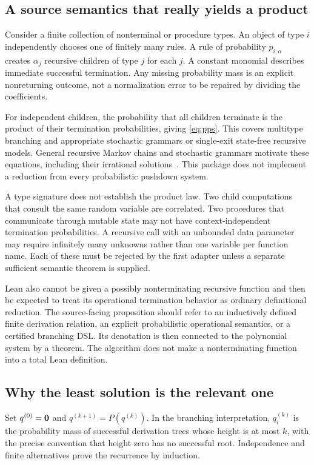 \documentclass[11pt,a4paper]{article}
\theoremstyle{definition}\newtheorem{definition}[theorem]{Definition}
\theoremstyle{remark}\newtheorem{remark}[theorem]{Remark}
\begin{document}
\subsection{A source semantics that really yields a product}
Consider a finite collection of nonterminal or procedure types. An object of type $i$ independently chooses one of finitely many rules. A rule of probability $p_{i,\alpha}$ creates $\alpha_j$ recursive children of type $j$ for each $j$. A constant monomial describes immediate successful termination. Any missing probability mass is an explicit nonreturning outcome, not a normalization error to be repaired by dividing the coefficients.

For independent children, the probability that all children terminate is the product of their termination probabilities, giving \eqref{eq:pps}. This covers multitype branching and appropriate stochastic grammars or single-exit state-free recursive models. General recursive Markov chains and stochastic grammars motivate these equations, including their irrational solutions~\cite{etessami-yannakakis}. This package does not implement a reduction from every probabilistic pushdown system.

A type signature does not establish the product law. Two child computations that consult the same random variable are correlated. Two procedures that communicate through mutable state may not have context-independent termination probabilities. A recursive call with an unbounded data parameter may require infinitely many unknowns rather than one variable per function name. Each of these must be rejected by the first adapter unless a separate sufficient semantic theorem is supplied.

Lean also cannot be given a possibly nonterminating recursive function and then be expected to treat its operational termination behavior as ordinary definitional reduction. The source-facing proposition should refer to an inductively defined finite derivation relation, an explicit probabilistic operational semantics, or a certified branching DSL. Its denotation is then connected to the polynomial system by a theorem. The algorithm does not make a nonterminating function into a total Lean definition.

\subsection{Why the least solution is the relevant one}
Set $q^{(0)}=\mathbf 0$ and $q^{(k+1)}=P(q^{(k)})$. In the branching interpretation, $q^{(k)}_i$ is the probability mass of successful derivation trees whose height is at most $k$, with the precise convention that height zero has no successful root. Independence and finite alternatives prove the recurrence by induction.
\end{document}
